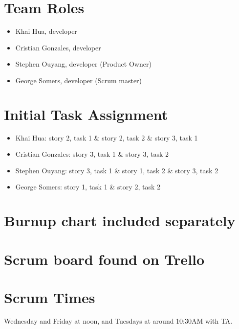 \documentclass[11pt]{article}
\begin{document}
	\section{Team Roles}
		\vspace{-3mm}
		\begin{itemize}
		    \item Khai Hua, developer
		    \item Cristian Gonzales, developer
		    \item Stephen Ouyang, developer (Product Owner)
		    \item George Somers, developer (Scrum master)
		\end{itemize}
	\section{Initial Task Assignment}
	    \vspace{-3mm}
	    \begin{itemize}
		    \item Khai Hua: story 2, task 1 \& story 2, task 2 \& story 3, task 1
		    \item Cristian Gonzales: story 3, task 1 \& story 3, task 2 
		    \item Stephen Ouyang: story 3, task 1 \& story 1, task 2 \& story 3, task 2
		    \item George Somers: story 1, task 1 \& story 2, task 2
		\end{itemize}
	\section{Burnup chart included separately}
	\section{Scrum board found on Trello}
	\section{Scrum Times}
	    Wednesday and Friday at noon, and Tuesdays at around 10:30AM with TA.
\end{document}
